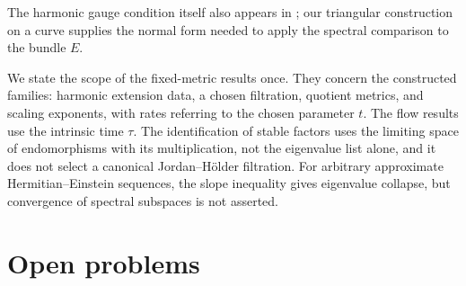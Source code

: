 \documentclass[11pt]{amsart}
\theoremstyle{definition}
\theoremstyle{remark}
\begin{document}
The harmonic gauge condition itself also appears in
\cite[Section~5.1]{SektnanTipler2024}; our triangular construction on a
curve supplies the normal form needed to apply the spectral comparison to
the bundle $E$.

We state the scope of the fixed-metric results once. They concern the
constructed families: harmonic extension data, a chosen filtration,
quotient metrics, and scaling exponents, with rates referring to the chosen
parameter $t$. The flow results use the intrinsic time $\tau$. The
identification of stable factors uses the limiting space of endomorphisms
with its multiplication, not the eigenvalue list alone, and it does not
select a canonical Jordan--H\"older filtration. For arbitrary approximate
Hermitian--Einstein sequences, the slope inequality gives eigenvalue
collapse, but convergence of spectral subspaces is not asserted.














\section{Open problems}\label{sec:limits}
\end{document}
